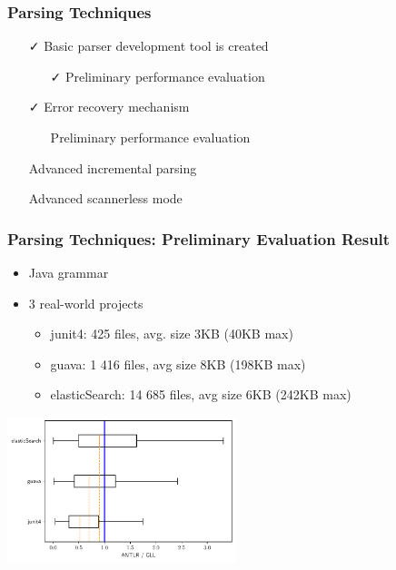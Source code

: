 \documentclass[xcolor=table,aspectratio=169]{beamer}
\begin{document}
\begin{frame}[fragile]
  \frametitle{Parsing Techniques}  
  \begin{itemize}
    \item[\faCheck] Basic parser development tool is created
    \begin{itemize}
      \item[\faCheck] Preliminary performance evaluation 
    \end{itemize}
    \item[\faCheck] Error recovery mechanism
    \begin{itemize}
      \item[\faGears] Preliminary performance evaluation 
    \end{itemize} 
    \item[\faHourglassHalf] Advanced incremental parsing
    \item[\faHourglassHalf] Advanced scannerless mode
  \end{itemize}
\end{frame}

\begin{frame}[fragile]
  \frametitle{Parsing Techniques: Preliminary Evaluation Result}  
  \begin{itemize}
    \item Java grammar
    \item 3 real-world projects
    \begin{itemize}
      \item junit4: 425 files, avg. size 3KB (40KB max)
      \item guava:  1 416 files, avg size 8KB (198KB max)
      \item elasticSearch: 14 685 files, avg size 6KB (242KB max)
    \end{itemize}
  \end{itemize}
  \begin{center}
    \includegraphics[width=0.5\textwidth]{pictures/gll_results.pdf}
  \end{center}
  
\end{frame}
\end{document}
